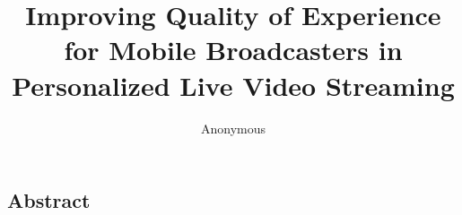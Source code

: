\documentclass[conference]{IEEEtran}
\begin{document}


\title{Improving Quality of Experience for Mobile Broadcasters in Personalized Live Video Streaming}

\author{Anonymous}

\maketitle


\subsection*{Abstract}


%












\begin{small}

\end{small}
\label{last-page}
\end{document}
